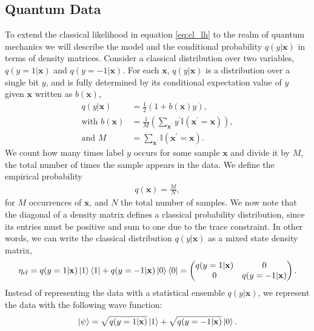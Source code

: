 \subsection{Quantum Data}\label{sec:qm_stats}

To extend the classical likelihood in equation \ref{eq:cl_lh} to the realm of quantum mechanics we will describe the model and the conditional probability $q(y|\mathbf{x})$ in terms of density matrices. 
Consider a classical distribution over two variables, $q(y=1|\mathbf{x})$ and $q(y=-1|\mathbf{x})$. For each $\mathbf{x}$, $q(y|\mathbf{x})$ is a distribution over a single bit $y$, and is fully determined by its conditional expectation value of $y$ given $\mathbf{x}$ written as $ b(\mathbf{x})$,
\begin{align}
    q(y|\mathbf{x}) &= \frac{1}{2}(1+b(\mathbf{x}) y)\nonumber,\\
    \text{with } b(\mathbf{x})&= \frac{1}{M}\left(\sum_{\mathbf{x}^\prime} 
    y^{\prime}\mathds{I}(\mathbf{x}^\prime=\mathbf{x})\right)\label{eq:sample_prob},\\
    \text{and } M &= \sum_{\mathbf{x}^\prime}\mathds{I}(\mathbf{x}^\prime = \mathbf{x})\nonumber.
\end{align}
We count how many times label $y$ occurs for some sample $\mathbf{x}$ and divide it by $M$, the total number of times the sample appears in the data. We define the empirical probability 
\begin{align*}
    q(\mathbf{x}) = \frac{M}{N},
\end{align*}
for $M$ occurrences of $\mathbf{x}$, and $N$ the total number of samples. We now note that the diagonal of a density matrix defines a classical probability distribution, since its entries must be positive and sum to one due to the trace constraint. In other words, we can write the classical distribution $q(y|\mathbf{x})$ as a mixed state density matrix,
\begin{equation*}
    \eta_{cl} = q(y=1|\mathbf{x}) \ket{1}\bra{1} + q(y=-1|\mathbf{x}) \ket{0}\bra{0} = 
    \begin{pmatrix}
    q(y=1|\mathbf{x}) & 0\\
    0 & q(y=-1|\mathbf{x})
    \end{pmatrix}.
\end{equation*}
Instead of representing the data with a statistical ensemble $q(y|\mathbf{x})$, we represent the data with the following wave function:
\begin{equation*}
    \ket{\psi} = \sqrt{q(y=1|\mathbf{x})}\ket{1} + \sqrt{q(y=-1|\mathbf{x})}\ket{0}.
\end{equation*}

